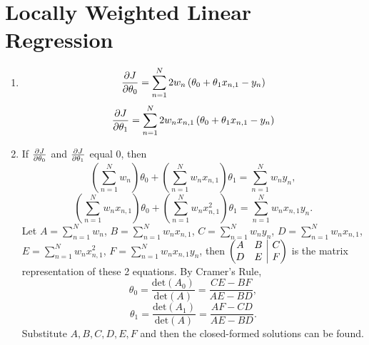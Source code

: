 \documentclass[11pt]{article}
\begin{document}
\section{Locally Weighted Linear Regression}
\begin{enumerate}[label=(\alph*)]
\item
    $$\pdv{J}{\theta_0} = \sum^N_{n=1}{2w_n\left(\theta_0+\theta_1x_{n,1}-y_n\right)}$$
    $$\pdv{J}{\theta_1} = \sum^N_{n=1}{2w_n x_{n,1}\left(\theta_0+\theta_1x_{n,1}-y_n\right)}$$
\item
    If $\pdv{J}{\theta_0}$ and $\pdv{J}{\theta_1}$ equal 0, then
    $$\left(\sum^N_{n=1}{w_n}\right)\theta_0 + \left(\sum^N_{n=1}{w_n x_{n,1}}\right)\theta_1 = \sum^N_{n=1}{w_n y_n},$$
    $$\left(\sum^N_{n=1}{w_n x_{n,1}}\right)\theta_0 + \left(\sum^N_{n=1}{w_n x_{n,1}^2}\right)\theta_1 = \sum^N_{n=1}{w_n x_{n,1} y_n}.$$
    Let $A = \sum^N_{n=1}{w_n}$, $B = \sum^N_{n=1}{w_n x_{n,1}}$, $C = \sum^N_{n=1}{w_n y_n}$, $D = \sum^N_{n=1}{w_n x_{n,1}}$, $E = \sum^N_{n=1}{w_n x_{n,1}^2}$, $F = \sum^N_{n=1}{w_n x_{n,1} y_n}$, then
    $
    \left(\begin{array}{@{}cc|c@{}}
        A & B & C\\
        D & E & F
    \end{array}\right)
    $
    is the matrix representation of these 2 equations. By Cramer's Rule,
    $$\theta_0 = \frac{\mathrm{det}\left(A_0\right)}{\mathrm{det}\left(A\right)} = \frac{CE-BF}{AE-BD},$$
    $$\theta_1 = \frac{\mathrm{det}\left(A_1\right)}{\mathrm{det}\left(A\right)} = \frac{AF-CD}{AE-BD}.$$
    Substitute $A, B, C, D, E, F$ and then the closed-formed solutions can be found.
\end{enumerate}
\end{document}
